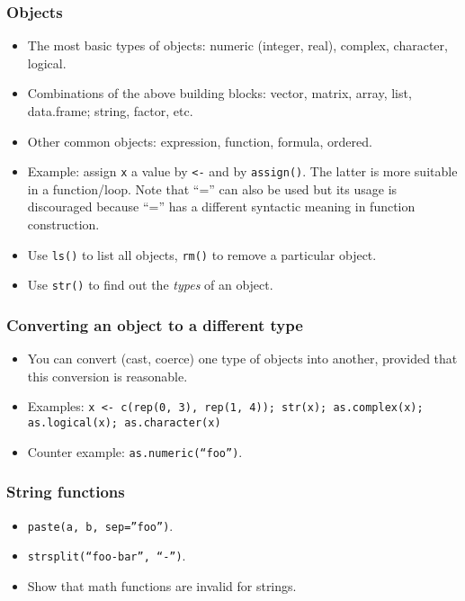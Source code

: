 \begin{frame}
  \frametitle{Objects}
  \begin{itemize}
  \item The most basic types of objects: numeric (integer, real),
    complex, character, logical.
  \item Combinations of the above building blocks: vector, matrix,
    array, list, data.frame; string, factor, etc.
  \item Other common objects: expression, function, formula, ordered.
  \item Example: assign \texttt{x} a value by \texttt{<-} and by
    \texttt{assign()}.  The latter is more suitable in a
    function/loop.  Note that ``='' can also be used but its usage is
    discouraged because ``='' has a different syntactic meaning in
    function construction.
  \item Use \texttt{ls()} to list all objects, \texttt{rm()} to remove
    a particular object.
  \item Use \texttt{str()} to find out the \emph{types} of an object.
  \end{itemize}
\end{frame}

\begin{frame}
  \frametitle{Converting an object to a different type}
  \begin{itemize}
  \item You can convert (cast, coerce) one type of objects into another, provided that this conversion is reasonable.
  \item Examples: \texttt{x <- c(rep(0, 3), rep(1, 4)); str(x);
      as.complex(x); as.logical(x); as.character(x)}
  \item Counter example: \texttt{as.numeric(``foo'')}.
  \end{itemize}
\end{frame}

\begin{frame}
  \frametitle{String functions}
  \begin{itemize}
  \item \texttt{paste(a, b, sep=''foo'')}.
  \item \texttt{strsplit(``foo-bar'', ``-'')}.
  \item Show that math functions are invalid for strings.
  \end{itemize}
\end{frame}

